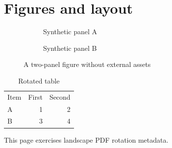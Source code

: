 \documentclass{article}
\begin{document}
\section*{Figures and layout}

\begin{figure}[H]
\centering
\begin{subfigure}{0.45\textwidth}
  \centering
  \caption{Synthetic panel A}
\end{subfigure}
\hfill
\begin{subfigure}{0.45\textwidth}
  \centering
  \caption{Synthetic panel B}
\end{subfigure}
\caption{A two-panel figure without external assets}
\end{figure}
\FloatBarrier

\begin{table}
\centering
\caption{Rotated table}
\begin{tabular}{lrr}
Item & First & Second \\
A & 1 & 2 \\
B & 3 & 4 \\
\end{tabular}
\end{table}

\begin{landscape}
This page exercises landscape PDF rotation metadata.
\end{landscape}
\end{document}
